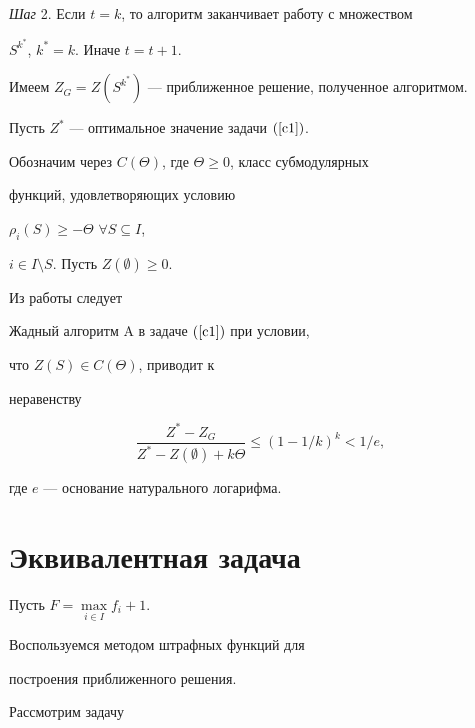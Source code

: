 {\it Шаг} 2. Если $t=k$, то алгоритм заканчивает работу с множеством 


$S^{k^*}$, $k^*=k$. Иначе $t=t+1$.





Имеем $Z_G=Z(S^{k^*})$ --- приближенное решение, полученное алгоритмом.


Пусть $Z^*$ --- оптимальное значение задачи $(\ref{c1})$.


Обозначим через $C(\Theta)$, где $\Theta \ge 0$, класс субмодулярных


функций, удовлетворяющих условию 


$\rho_i(S) \ge - \Theta$ $\forall S \subseteq I$, 


$i \in I \setminus S$. Пусть $Z( \emptyset) \ge 0$.





Из работы \cite{NWF78} следует





\begin{thm} 


\label{t1}


Жадный алгоритм $\mathrm A$ в задаче $(\ref{c1})$ при условии, 


что $Z(S) \in C(\Theta)$, приводит к


неравенству


$$


\frac{Z^* -Z_G}{Z^*-Z(\emptyset)+k\Theta} \le (1- 1 / k )^k< 1/e,


$$


где $e$ --- основание натурального логарифма.


\end{thm}





\section{Эквивалентная задача}





Пусть $F= \max\limits_{i \in I}f_i+1$.


Воспользуемся методом штрафных функций для 


построения приближенного решения.





Рассмотрим задачу


